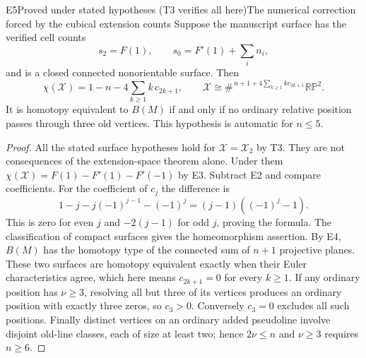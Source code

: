 \begin{resultenv}{E5}{Proved under stated hypotheses (T3 verifies all here)}{The numerical correction forced by the cubical extension counts}
Suppose the manuscript surface has the verified cell counts
\[
 s_2=F(1),\qquad s_0=F'(1)+\sum_i n_i,
\]
and is a closed connected nonorientable surface. Then
\[
 \chi(\mathcal X)
 =1-n-4\sum_{k\geq1}k\,c_{2k+1},
 \qquad
 \mathcal X\cong\#^{\,n+1+4\sum_{k\geq1}k c_{2k+1}}\mathbb {RP}^2.
\]
It is homotopy equivalent to $B(M)$ if and only if no ordinary relative
position passes through three old vertices. This hypothesis is automatic
for $n\leq5$.
\end{resultenv}
\begin{proof}
All the stated surface hypotheses hold for $\mathcal X=\mathcal X_2$ by
T3. They are not consequences of the extension-space theorem alone.
Under them $\chi(\mathcal X)=F(1)-F'(1)-F'(-1)$ by E3. Subtract E2 and
compare coefficients. For the coefficient of $c_j$ the difference is
\[
 1-j-j(-1)^{j-1}-(-1)^j=(j-1)((-1)^j-1).
\]
This is zero for even $j$ and $-2(j-1)$ for odd $j$, proving the formula.
The classification of compact surfaces gives the homeomorphism assertion.
By E4, $B(M)$ has the homotopy type of the connected sum of $n+1$ projective
planes. These two surfaces are homotopy equivalent exactly when their Euler
characteristics agree, which here means $c_{2k+1}=0$ for every $k\geq1$.
If any ordinary position has $\nu\geq3$, resolving all but three of its
vertices produces an ordinary position with exactly three zeros, so $c_3>0$.
Conversely $c_3=0$ excludes all such positions. Finally distinct vertices on
an ordinary added pseudoline involve disjoint old-line classes, each of size
at least two; hence $2\nu\leq n$ and $\nu\geq3$ requires $n\geq6$.
\end{proof}

